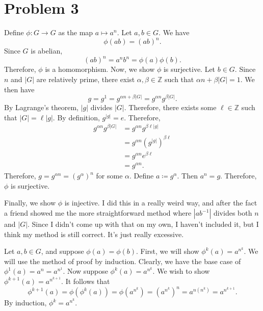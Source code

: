 \documentclass[11pt, letterpaper]{article}
\begin{document}
\section*{Problem 3}
\begin{solution}
Define $\phi : G \to G$ as the map $a\mapsto a^n$. Let $a,b\in G$. We have
\[
	\phi (ab)=(ab)^n
.\]
Since $G$ is abelian,
\[
	(ab)^n=a^nb^n=\phi (a)\phi (b)
.\]
Therefore, $\phi $ is a homomorphism. Now, we show $\phi $ is surjective. Let $b\in G$. Since $n$ and $\left| G \right| $ are relatively prime, there exist $\alpha ,\beta \in\mathbb{Z}$ such that $\alpha n+\beta \left| G \right| =1$. We then have
\[
	g=g^1=g^{\alpha n+\beta \left| G \right| }=g^{\alpha n}g^{\beta \left| G \right| }
.\]
By Lagrange's theorem, $\left| g \right| $ divides $\left| G \right| $. Therefore, there exists some $\ell \in\mathbb{Z}$ such that $\left| G \right| =\ell \left| g \right| $. By definition, $g^{\left| g \right| }=e$. Therefore,
\begin{align*}
	g^{\alpha n}g^{\beta \left| G \right| }&=g^{\alpha n}g^{\beta \ell \left| g \right| }\\
	 &=g^{\alpha n}\left( g^{\left| g \right| } \right) ^{\beta \ell }\\
	 &=g^{\alpha n}e^{\beta \ell }\\
	 &=g^{\alpha n}
.\end{align*}
Therefore, $g=g^{\alpha n}=\left( g^{\alpha } \right) ^{n}$ for some $\alpha $. Define $a\coloneqq g^{\alpha }$. Then $a ^n=g$. Therefore, $\phi $ is surjective.

Finally, we show $\phi $ is injective. I did this in a really weird way, and after the fact a friend showed me the more straightforward method where $\left| ab^{-1} \right| $ divides both $n$ and $\left| G \right| $. Since I didn't come up with that on my own, I haven't included it, but I think my method is still correct. It's just really excessive.

Let $a,b\in G$, and suppose $\phi (a)=\phi (b)$. First, we will show $\phi^k(a)=a^{n^k}$. We will use the method of proof by induction. Clearly, we have the base case of $\phi ^1(a)=a^n=a^{n^1}$. Now suppose $\phi ^k(a)=a^{n^k}$. We wish to show $\phi ^{k+1}(a)=a^{n^{k+1}}$. It follows that
\[
	\phi ^{k+1}(a)=\phi\left( \phi ^k(a) \right) =\phi \left( a^{n^k} \right) =\left( a^{n^k} \right) ^n=a^{n\left( n^k \right) }=a^{n^{k+1}}
.\]
By induction, $\phi ^k = a^{n^k}$.


\end{solution}
\end{document}
